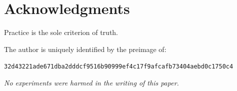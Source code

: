 \documentclass[12pt]{article}
\begin{document}
\section*{Acknowledgments}

Practice is the sole criterion of truth.

The author is uniquely identified by the preimage of:
\begin{center}
\texttt{32d43221ade671dba2dddcf9516b90999ef4c17f9afcafb73404aebd0c1750c4}
\end{center}

\begin{flushright}
\textit{No experiments were harmed in the writing of this paper.}
\end{flushright}
\end{document}
